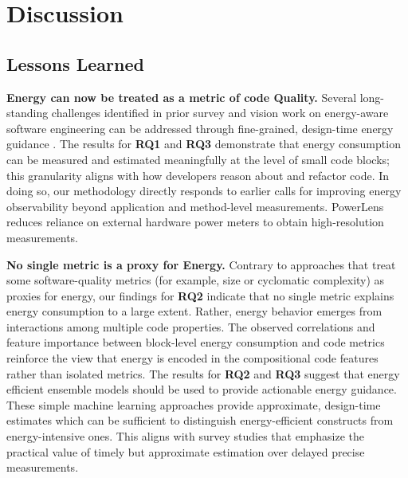 
\section{Discussion}
\label{sec:Discussion}
\subsection{Lessons Learned}

\textbf{Energy can now be treated as a metric of code Quality.} Several long-standing challenges identified in prior survey and vision work on energy-aware software engineering can be addressed through fine-grained, design-time energy guidance \cite{LEE2024111944}. The results for \textbf{RQ1} and \textbf{RQ3} demonstrate that energy consumption can be measured and estimated meaningfully at the level of small code blocks; this granularity aligns with how developers reason about and refactor code. In doing so, our methodology directly responds to earlier calls for improving energy observability beyond application and method-level measurements\cite{10.1145/2425248.2425252,7429297}. PowerLens reduces reliance on external hardware power meters to obtain high-resolution measurements. 

\noindent
\textbf{No single metric is a proxy for Energy.} Contrary to approaches that treat some software-quality metrics (for example, size or cyclomatic complexity) as proxies for energy\cite{10329262}, our findings for \textbf{RQ2} indicate that no single metric explains energy consumption to a large extent. Rather, energy behavior emerges from interactions among multiple code properties. The observed correlations and feature importance between block-level energy consumption and code metrics reinforce the view that energy is encoded in the compositional code features rather than isolated metrics.
The results for \textbf{RQ2} and \textbf{RQ3} suggest that energy efficient ensemble models should be used to provide actionable energy guidance. These simple machine learning approaches provide approximate, design-time estimates which can be sufficient to distinguish energy-efficient constructs from energy-intensive ones. This aligns with survey studies that emphasize the practical value of timely but approximate estimation over delayed precise measurements\cite{ZARAGOZA2025115889,LEE2024111944}. 

